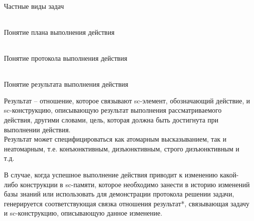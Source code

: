\begin{frame}{\\Частные виды задач}
    \topline
	\justifying
    \begin{SCn}
    \end{SCn}
\end{frame}

\begin{frame}{\\Понятие плана выполнения действия}
	\topline
	\justifying
\end{frame}

\begin{frame}{\\Понятие протокола выполнения действия}
	\topline
	\justifying
 
\end{frame}

\begin{frame}{\\Понятие результата выполнения действия}
	\topline
	\justifying
 
    \bigskip
    
    Результат -- отношение, которое  связывают sc-элемент, обозначающий действие, и sc-конструкцию, описывающую результат выполнения рассматриваемого действия, другими словами, цель, которая должна быть достигнута при выполнении действия.\\
    Результат может специфицироваться как атомарным высказыванием, так и неатомарным, т.е. конъюнктивным, дизъюнктивным, строго дизъюнктивным и т.д.\\
    
    \bigskip
    
    В случае, когда успешное выполнение действия приводит к изменению какой-либо конструкции в sc-памяти,  которое необходимо занести в историю изменений базы знаний или использовать для демонстрации протокола решении задачи, генерируется соответствующая связка отношения результат*, связывающая  задачу и sc-конструкцию, описывающую данное изменение. 
\end{frame}

